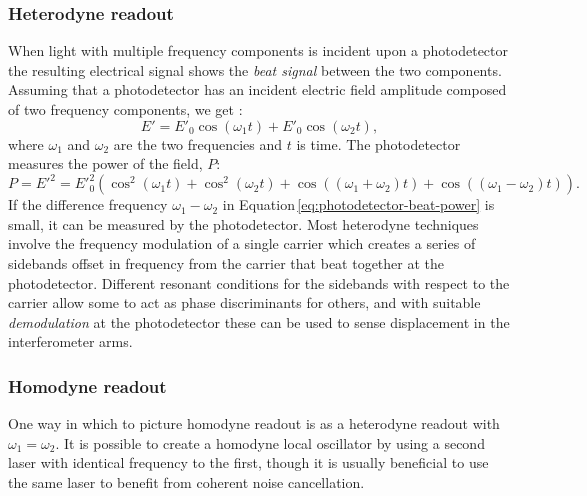 \subsubsection{Heterodyne readout}
When light with multiple frequency components is incident upon a photodetector the resulting electrical signal shows the \emph{beat signal} between the two components. Assuming that a photodetector has an incident electric field amplitude composed of two frequency components, we get \cite{Freise2010}:
\begin{equation}
  E' = E'_0 \cos \left( \omega_1 t \right) + E'_0 \cos \left( \omega_2 t \right),
\end{equation}
where $\omega_1$ and $\omega_2$ are the two frequencies and $t$ is time. The photodetector measures the power of the field, $P$:
\begin{equation}
  \label{eq:photodetector-beat-power}
  P = {E'}^2 = {E'}_0^2 \left( \cos^2 \left( \omega_1 t \right) + \cos^2 \left( \omega_2 t \right) + \cos \left( \left( \omega_1 + \omega_2 \right) t \right) + \cos \left( \left( \omega_1 - \omega_2 \right) t \right) \right).
\end{equation}
If the difference frequency $\omega_1 - \omega_2$ in Equation\,\ref{eq:photodetector-beat-power} is small, it can be measured by the photodetector. Most heterodyne techniques involve the frequency modulation of a single carrier which creates a series of sidebands offset in frequency from the carrier that beat together at the photodetector. Different resonant conditions for the sidebands with respect to the carrier allow some to act as phase discriminants for others, and with suitable \emph{demodulation} at the photodetector these can be used to sense displacement in the interferometer arms.

\subsubsection{\label{sec:homodyne-readout}Homodyne readout}
One way in which to picture homodyne readout is as a heterodyne readout with $\omega_1 = \omega_2$. It is possible to create a homodyne local oscillator by using a second laser with identical frequency to the first, though it is usually beneficial to use the same laser to benefit from coherent noise cancellation.

